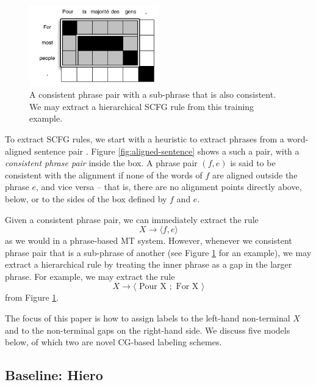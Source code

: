 \documentclass[a4paper]{article}
\begin{document}
\begin{figure}[t]
\includegraphics[width=0.5\textwidth]{../wmt11/figures/hierarchical-rule}
\caption{A consistent phrase pair with a sub-phrase that is also consistent. We may extract a hierarchical SCFG rule from this training example.\label{fig:hierarchical-phrases}}
\end{figure}

To extract SCFG rules, we start with a heuristic to extract phrases from a word-aligned sentence pair \cite{tillmann-2003}. Figure \ref{fig:aligned-sentence} shows a such a pair, with a {\em consistent phrase pair} inside the box. A phrase pair $(f,e)$ is said to be consistent with the alignment if none of the words of $f$ are aligned outside the phrase $e$, and vice versa -- that is, there are no alignment points directly above, below, or to the sides of the box defined by $f$ and $e$.

Given a consistent phrase pair, we can immediately extract the rule
\begin{equation}
X \to \langle f , e \rangle
\end{equation}
as we would in a phrase-based MT system. However, whenever we consistent phrase pair that is a sub-phrase of another (see Figure \ref{fig:hierarchical-phrases} for an example), we may extract a hierarchical rule by treating the inner phrase as a gap in the larger phrase. For example, we may extract the rule
\begin{equation}
X \to \langle \textrm{ Pour X }; \textrm{ For X } \rangle
\label{eqn:hiero-rule}
\end{equation}
from Figure \ref{fig:hierarchical-phrases}.

The focus of this paper is how to assign labels to the left-hand non-terminal $X$ and to the non-terminal gaps on the right-hand side. We discuss five models below, of which two are novel CG-based labeling schemes.

\subsection{Baseline: Hiero}
\end{document}
